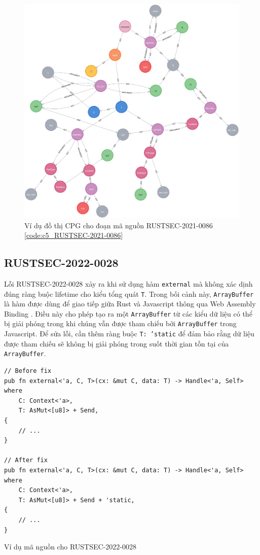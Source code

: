 \begin{figure}[H]
    \includegraphics[width=1\columnwidth]{figures/c5/c5_RUSTSEC-2021-0086}
    \centering
    \caption{Ví dụ đồ thị CPG cho đoạn mã nguồn RUSTSEC-2021-0086 \ref{code:c5_RUSTSEC-2021-0086}}
    \label{img:c5_RUSTSEC-2021-0086}
\end{figure}

\subsection{RUSTSEC-2022-0028}

Lỗi RUSTSEC-2022-0028 xảy ra khi sử dụng hàm \texttt{external} mà không xác dịnh đúng ràng buộc lifetime cho kiểu tổng quát \texttt{T}.
Trong bối cảnh này, \texttt{ArrayBuffer} là hàm được dùng để giao tiếp giữa Rust và Javascript thông qua Web Assembly Binding \cite{ githubGitHubRustwasmwasmbindgen}.
Điều này cho phép tạo ra một \texttt{ArrayBuffer} từ các kiểu dữ liệu có thể bị giải phóng trong khi chúng vẫn được tham chiếu bởi \texttt{ArrayBuffer} trong Javascript.
Để sửa lỗi, cần thêm ràng buộc \texttt{T: 'static} để đảm bảo rằng dữ liệu được tham chiếu sẽ không bị giải phóng trong suốt thời gian tồn tại của \texttt{ArrayBuffer}.

\begin{listing}[H]
\begin{verbatim}
// Before fix
pub fn external<'a, C, T>(cx: &mut C, data: T) -> Handle<'a, Self>
where
    C: Context<'a>,
    T: AsMut<[u8]> + Send,
{
    // ...
}

// After fix
pub fn external<'a, C, T>(cx: &mut C, data: T) -> Handle<'a, Self>
where
    C: Context<'a>,
    T: AsMut<[u8]> + Send + 'static,
{
    // ...
}
\end{verbatim}
\caption{Ví dụ mã nguồn cho RUSTSEC-2022-0028}
\label{code:c5_RUSTSEC-2022-0028}
\end{listing}

